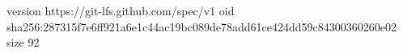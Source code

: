 version https://git-lfs.github.com/spec/v1
oid sha256:287315f7e6ff921a6e1c44ac19bc089de78add61ce424dd59c84300360260e02
size 92
